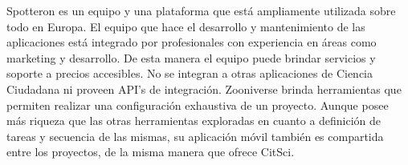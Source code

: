 Spotteron es un equipo y una plataforma que está ampliamente utilizada sobre todo en Europa. El equipo que hace el desarrollo y mantenimiento de las aplicaciones está integrado por profesionales con experiencia en áreas como marketing y desarrollo. De esta manera el equipo puede brindar servicios y soporte  a precios accesibles. No se integran a otras aplicaciones de Ciencia Ciudadana ni proveen API's de integración.
Zooniverse brinda herramientas que permiten realizar una configuración exhaustiva de un proyecto. Aunque posee más riqueza que las otras herramientas exploradas en cuanto a definición de tareas y secuencia de las mismas, su aplicación móvil también es compartida entre los proyectos, de la misma manera que ofrece CitSci. 

